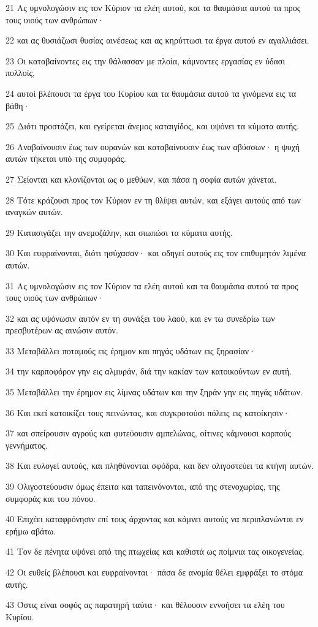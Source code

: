 \par 21 Ας υμνολογώσιν εις τον Κύριον τα ελέη αυτού, και τα θαυμάσια αυτού τα προς τους υιούς των ανθρώπων·
\par 22 και ας θυσιάζωσι θυσίας αινέσεως και ας κηρύττωσι τα έργα αυτού εν αγαλλιάσει.
\par 23 Οι καταβαίνοντες εις την θάλασσαν με πλοία, κάμνοντες εργασίας εν ύδασι πολλοίς,
\par 24 αυτοί βλέπουσι τα έργα του Κυρίου και τα θαυμάσια αυτού τα γινόμενα εις τα βάθη·
\par 25 Διότι προστάζει, και εγείρεται άνεμος καταιγίδος, και υψόνει τα κύματα αυτής.
\par 26 Αναβαίνουσιν έως των ουρανών και καταβαίνουσιν έως των αβύσσων· η ψυχή αυτών τήκεται υπό της συμφοράς.
\par 27 Σείονται και κλονίζονται ως ο μεθύων, και πάσα η σοφία αυτών χάνεται.
\par 28 Τότε κράζουσι προς τον Κύριον εν τη θλίψει αυτών, και εξάγει αυτούς από των αναγκών αυτών.
\par 29 Κατασιγάζει την ανεμοζάλην, και σιωπώσι τα κύματα αυτής.
\par 30 Και ευφραίνονται, διότι ησύχασαν· και οδηγεί αυτούς εις τον επιθυμητόν λιμένα αυτών.
\par 31 Ας υμνολογώσιν εις τον Κύριον τα ελέη αυτού και τα θαυμάσια αυτού τα προς τους υιούς των ανθρώπων·
\par 32 και ας υψόνωσιν αυτόν εν τη συνάξει του λαού, και εν τω συνεδρίω των πρεσβυτέρων ας αινώσιν αυτόν.
\par 33 Μεταβάλλει ποταμούς εις έρημον και πηγάς υδάτων εις ξηρασίαν·
\par 34 την καρποφόρον γην εις αλμυράν, διά την κακίαν των κατοικούντων εν αυτή.
\par 35 Μεταβάλλει την έρημον εις λίμνας υδάτων και την ξηράν γην εις πηγάς υδάτων.
\par 36 Και εκεί κατοικίζει τους πεινώντας, και συγκροτούσι πόλεις εις κατοίκησιν·
\par 37 και σπείρουσιν αγρούς και φυτεύουσιν αμπελώνας, οίτινες κάμνουσι καρπούς γεννήματος.
\par 38 Και ευλογεί αυτούς, και πληθύνονται σφόδρα, και δεν ολιγοστεύει τα κτήνη αυτών.
\par 39 Ολιγοστεύουσιν όμως έπειτα και ταπεινόνονται, από της στενοχωρίας, της συμφοράς και του πόνου.
\par 40 Επιχέει καταφρόνησιν επί τους άρχοντας και κάμνει αυτούς να περιπλανώνται εν ερήμω αβάτω.
\par 41 Τον δε πένητα υψόνει από της πτωχείας και καθιστά ως ποίμνια τας οικογενείας.
\par 42 Οι ευθείς βλέπουσι και ευφραίνονται· πάσα δε ανομία θέλει εμφράξει το στόμα αυτής.
\par 43 Όστις είναι σοφός ας παρατηρή ταύτα· και θέλουσιν εννοήσει τα ελέη του Κυρίου.

